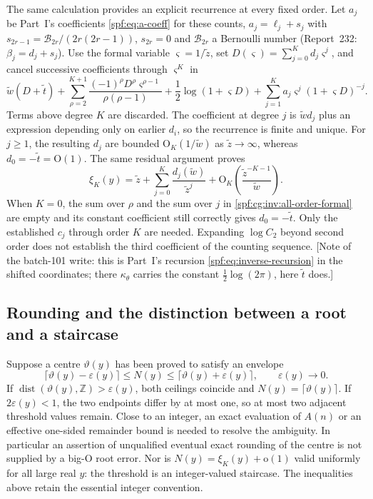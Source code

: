 \documentclass[11pt]{article}
\numberwithin{equation}{section}
\theoremstyle{definition}
\theoremstyle{remark}
\theoremstyle{definition}
\newcommand{\bigO}{\mathrm O}
\newcommand{\smallo}{\mathrm o}
\begin{document}
The same calculation provides an explicit recurrence at every fixed order.
Let $a_j$ be Part~I's coefficients \eqref{spf:eq:a-coeff} for these counts,
$a_j=\ell_j+s_j$ with $s_{2r-1}=\mathcal B_{2r}/(2r(2r-1))$, $s_{2r}=0$ and
$\mathcal B_{2r}$ a Bernoulli number (Report~232: $\beta_j=d_j+s_j$). Use the
formal variable $\varsigma=1/\tilde z$, set $D(\varsigma)=\sum_{j=0}^Kd_j\varsigma^j$,
and cancel successive coefficients through $\varsigma^K$ in
\begin{equation}
 \tilde w(D+\tilde t)+
 \sum_{\rho=2}^{K+1}\frac{(-1)^\rho D^\rho\varsigma^{\rho-1}}{\rho(\rho-1)}
 +\frac12\log(1+\varsigma D)
 +\sum_{j=1}^Ka_j\varsigma^j(1+\varsigma D)^{-j}.
 \label{spf:cg:inv:all-order-formal}
\end{equation}
Terms above degree $K$ are discarded. The coefficient at degree $j$ is
$\tilde wd_j$ plus an expression depending only on earlier $d_i$, so the
recurrence is finite and unique. For $j\geq1$, the resulting $d_j$ are
bounded $\bigO_K(1/\tilde w)$ as $\tilde z\to\infty$, whereas
$d_0=-\tilde t=\bigO(1)$. The same residual argument proves
\[
 \xi_K(y)=\tilde z+\sum_{j=0}^K\frac{d_j(\tilde w)}{\tilde z^j}
           +\bigO_K\left(\frac{\tilde z^{-K-1}}{\tilde w}\right).
\]
When $K=0$, the sum over $\rho$ and the sum over $j$ in
\eqref{spf:cg:inv:all-order-formal} are empty and its constant coefficient still
correctly gives $d_0=-\tilde t$. Only the established $c_j$ through order $K$
are needed. Expanding $\log C_2$ beyond second order does not establish the
third coefficient of the counting sequence. [Note of the batch-101 write:
this is Part~I's recursion \eqref{spf:eq:inverse-recursion} in the shifted
coordinates; there $\kappa_\theta$ carries the constant $\frac12\log(2\pi)$,
here $\tilde t$ does.]

\subsection{Rounding and the distinction between a root and a staircase}

Suppose a centre $\vartheta(y)$ has been proved to satisfy an envelope
\[
 \lceil \vartheta(y)-\varepsilon(y)\rceil\leq N(y)
 \leq\lceil \vartheta(y)+\varepsilon(y)\rceil,
 \qquad \varepsilon(y)\longrightarrow0.
\]
If $\operatorname{dist}(\vartheta(y),\mathbb Z)>\varepsilon(y)$, both ceilings
coincide and $N(y)=\lceil \vartheta(y)\rceil$. If $2\varepsilon(y)<1$, the two
endpoints differ by at most one, so at most two adjacent threshold values
remain. Close to an integer, an exact evaluation of $A(n)$ or an effective
one-sided remainder bound is needed to resolve the ambiguity.
In particular an assertion of unqualified eventual exact rounding of the
centre is not supplied by a big-$\mathrm O$ root error. Nor is
$N(y)=\xi_K(y)+\smallo(1)$ valid uniformly for all large real $y$: the
threshold is an integer-valued staircase. The inequalities above retain the
essential integer convention.
\end{document}
